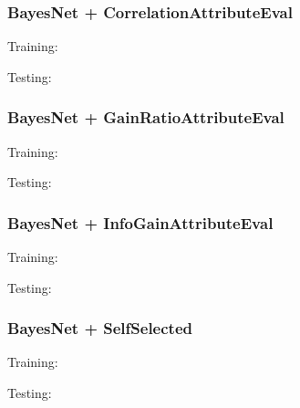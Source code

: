 \documentclass{article}
\begin{document}
\subsubsection{BayesNet + CorrelationAttributeEval}\label{app:BayesNet + CorrelationAttributeEval weka outputs}
Training:

Testing:


\subsubsection{BayesNet + GainRatioAttributeEval}\label{app:BayesNet + GainRatioAttributeEval weka outputs}
Training:

Testing:


\subsubsection{BayesNet + InfoGainAttributeEval}\label{app:BayesNet + InfoGainAttributeEval weka outputs}
Training:

Testing:


\subsubsection{BayesNet + SelfSelected}\label{app:BayesNet + SelfSelected weka outputs}
Training:

Testing:

\end{document}
